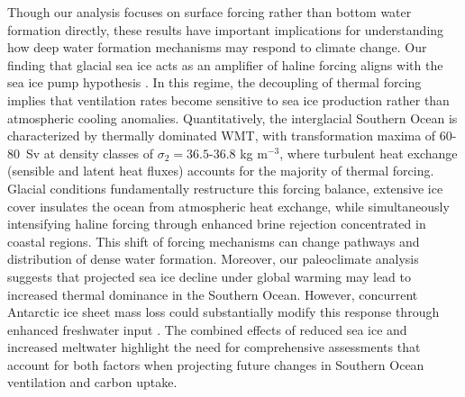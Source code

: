 \documentclass[draft]{agujournal2025}
\begin{document}
Though our analysis focuses on surface forcing rather than bottom water formation directly, these results have important implications for understanding how deep water formation mechanisms may respond to climate change. Our finding that glacial sea ice acts as an amplifier of haline forcing aligns with the sea ice pump hypothesis \cite{Abernathey2016}. In this regime, the decoupling of thermal forcing implies that ventilation rates become sensitive to sea ice production rather than atmospheric cooling anomalies. Quantitatively, the interglacial Southern Ocean is characterized by thermally dominated WMT, with transformation maxima of 60-80~Sv at density classes of $\sigma_2 = 36.5$-$36.8$ kg m$^{-3}$, where turbulent heat exchange (sensible and latent heat fluxes) accounts for the majority of thermal forcing. Glacial conditions fundamentally restructure this forcing balance, extensive ice cover insulates the ocean from atmospheric heat exchange, while simultaneously intensifying haline forcing through enhanced brine rejection concentrated in coastal regions. This shift of forcing mechanisms can change pathways and distribution of dense water formation. Moreover, our paleoclimate analysis suggests that projected sea ice decline under global warming may lead to increased thermal dominance in the Southern Ocean.  However, concurrent Antarctic ice sheet mass loss could substantially modify this response through enhanced freshwater input \cite{Li2023Nature,Silvano2018}. The combined effects of reduced sea ice and increased meltwater highlight the need for comprehensive  assessments that account for both factors when projecting future changes in Southern Ocean ventilation and carbon uptake.
\end{document}
